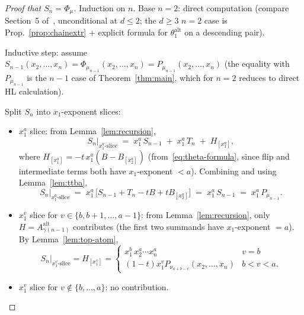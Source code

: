 \documentclass[11pt]{article}
\theoremstyle{definition}
\newcommand{\Aalt}{A^{\mathrm{alt}}}
\newcommand{\thalt}{\theta^{\mathrm{alt}}}
\begin{document}
\begin{proof}[Proof that $S_n = \Phi_\mu$]
Induction on $n$. Base $n = 2$: direct computation (compare
Section~5 of~\cite{clio-0725}, unconditional at $d \le 2$; the $d \ge 3$
$n = 2$ case is Prop.~\ref{prop:chainextr} + explicit formula for
$\thalt_1$ on a descending pair).

Inductive step: assume $S_{n-1}(x_2, \ldots, x_n) = \Phi_{\mu_{n-1}}(x_2, \ldots, x_n) = P_{\mu_{n-1}}(x_2, \ldots, x_n)$
(the equality with $P_{\mu_{n-1}}$ is the $n-1$ case of Theorem~\ref{thm:main},
which for $n = 2$ reduces to direct HL calculation).

Split $S_n$ into $x_1$-exponent slices:
\begin{itemize}
\item[(a)] $x_1^a$ slice: from Lemma~\ref{lem:recursion},
  \[
    S_n \big|_{x_1^a\text{-slice}} \;=\; x_1^a\, S_{n-1} \;+\; x_1^a\, T_n \;+\; H_{[x_1^a]},
  \]
  where $H_{[x_1^a]} = -t\, x_1^a (B - B_{[x_2^a]})$ (from~\eqref{eq:theta-formula},
  since flip and intermediate terms both have $x_1$-exponent $< a$).
  Combining and using Lemma~\ref{lem:ttba},
  \[
    S_n \big|_{x_1^a\text{-slice}} \;=\; x_1^a\, \bigl[S_{n-1} + T_n - t B + t B_{[x_2^a]}\bigr]
    \;=\; x_1^a\, S_{n-1}
    \;=\; x_1^a\, P_{\mu_{n-1}}.
  \]
\item[(b)] $x_1^v$ slice for $v \in \{b, b+1, \ldots, a-1\}$: from
  Lemma~\ref{lem:recursion}, only $H = \Aalt_{\gamma(n-1)}$ contributes
  (the first two summands have $x_1$-exponent $= a$). By
  Lemma~\ref{lem:top-atom},
  \[
    S_n \big|_{x_1^v\text{-slice}} = H_{[x_1^v]} = \begin{cases} x_1^b\, x_2^a \cdots x_n^a & v = b\\ (1-t) x_1^v P_{\nu_{a+b-v}}(x_2, \ldots, x_n) & b < v < a. \end{cases}
  \]
\item[(c)] $x_1^v$ slice for $v \notin \{b, \ldots, a\}$: no contribution.
\end{itemize}


\end{proof}
\end{document}
